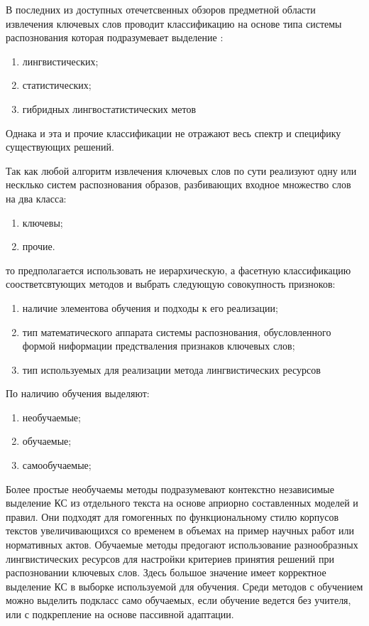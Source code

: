 В последних из доступных отечетсвенных обзоров предметной области извлечения ключевых слов проводит классификацию на основе типа системы распознования которая подразумевает выделение \cite{7}:
\begin{enumerate}
	\item лингвистических;
	\item статистических;
	\item гибридных лингвостатистических метов
\end{enumerate}

Однака и эта и прочие классификации не отражают весь спектр и специфику существующих решений.

Так как любой алгоритм извлечения ключевых слов по сути реализуют одну или несклько систем распознования образов, разбивающих входное множество слов на два класса:
\begin{enumerate}
	\item ключевы;
	\item прочие.
\end{enumerate}

то предполагается использовать не иерархическую, а фасетную классификацию соостветсвтующих методов и выбрать следующую совокупность призноков:
\begin{enumerate}
	\item наличие элементова обучения и подходы к его реализации;
	\item тип математического аппарата системы распознования, обусловленного формой ниформации предстваления признаков ключевых слов;
	\item тип используемых для реализации метода лингвистических ресурсов
\end{enumerate}

По наличию обучения выделяют:
\begin{enumerate}
	\item необучаемые;
	\item обучаемые;
	\item самообучаемые; 
\end{enumerate}
Более простые необучаемы методы подразумевают контекстно независимые выделение КС из отдельного текста на основе априорно составленных моделей и правил. Они подходят для гомогенных по функциональному стилю корпусов текстов увеличивающихся со временем в объемах на пример научных работ или нормативных актов.
Обучаемые методы предогают использование разнообразных лингвистических ресурсов для настройки критериев принятия решений при распозновании ключевых слов.
Здесь большое значение имеет корректное выделение КС в выборке используемой для обучения.
Среди методов с обучением можно выделить подкласс само обучаемых, если обучение ведется без учителя, или с подкрепление на основе пассивной адаптации.\cite{20}

